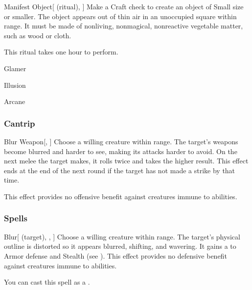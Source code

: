 \lowercase{\hypertarget{spell:Manifest Object}{}}\label{spell:Manifest Object}
\begin{attuneability}[\nth{2}]{\hypertarget{spell:Manifest Object}{Manifest Object}}[ (ritual), ]
Make a Craft check to create an object of Small size or smaller.
The object appears out of thin air in an unoccupied square within \rngclose range.
It must be made of nonliving, nonmagical, nonreactive vegetable matter, such as wood or cloth.

This ritual takes one hour to perform.
\end{attuneability}
\vspace{0.25em}


\newpage
\begin{spellsection}{Glamer}

\begin{spellheader}
\end{spellheader}


 Illusion

 Arcane

\subsubsection{Cantrip}


\begin{freeability}{Blur Weapon}[, ]
Choose a willing creature within \rngclose range.
The target's weapons become blurred and harder to see, making its attacks harder to avoid.
On the next melee  the target makes, it rolls twice and takes the higher result.
This effect ends at the end of the next round if the target has not made a strike by that time.

This effect provides no offensive benefit against creatures immune to  abilities.
\end{freeability}

\end{spellsection}


\subsubsection{Spells}


\lowercase{\hypertarget{spell:Blur}{}}\label{spell:Blur}
\begin{attuneability}[\nth{1}]{\hypertarget{spell:Blur}{Blur}}[ (target), , ]
Choose a willing creature within \rngmed range.
The target's physical outline is distorted so it appears blurred, shifting, and wavering.
It gains a   to Armor defense and Stealth (see ).
This effect provides no defensive benefit against creatures immune to  abilities.

You can cast this spell as a .
\end{attuneability}
\vspace{0.25em}



